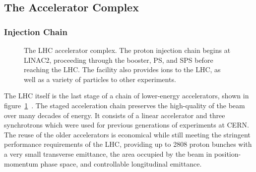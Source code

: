 \FloatBarrier

\subsection{The Accelerator Complex}

\subsubsection{Injection Chain}

\begin{figure}[htbp]
	\centering
	\caption{The LHC accelerator complex. The proton injection chain begins at LINAC2, proceeding through the booster, PS, and SPS before reaching the LHC. The facility also provides ions to the LHC, as well as a variety of particles to other experiments.}
	\label{fig:LHC-accelerator-complex}
\end{figure}


The LHC itself is the last stage of a chain of lower-energy accelerators, shown in figure~\ref{fig:LHC-accelerator-complex}~\cite{Benedikt:2004wm}. The staged acceleration chain preserves the high-quality of the beam over many decades of energy. It consists of a linear accelerator and three synchrotrons which were used for previous generations of experiments at CERN. The reuse of the older accelerators is economical while still meeting the stringent performance requirements of the LHC, providing up to 2808 proton bunches with a very small transverse emittance, the area occupied by the beam in position-momentum phase space, and controllable longitudinal emittance. 

